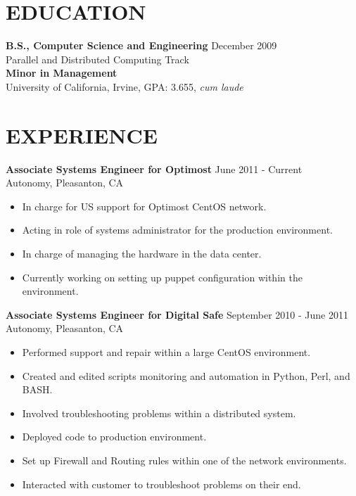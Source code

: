 \documentclass[10pt,line,margin]{res}
\begin{document}
\address{4245 Stanley Blvd. Apt. 6, Pleasanton, CA}
\address{jobs@apeschel.fastmail.fm or (760)-791-7301}

\begin{resume}
\section{EDUCATION}
    {\bf B.S., Computer Science and Engineering} \hfill December 2009 \\
    Parallel and Distributed Computing Track \\
    {\bf Minor in Management} \\
    University of California, Irvine, GPA: 3.655, \textit{cum laude}

\section{EXPERIENCE}
    {\bf Associate Systems Engineer for Optimost} \hfill June 2011 - Current\\
    Autonomy, Pleasanton, CA
    \begin{itemize} \itemsep -2pt
    \item In charge for US support for Optimost CentOS network.
    \item Acting in role of systems administrator for the production environment.
    \item In charge of managing the hardware in the data center.
    \item Currently working on setting up puppet configuration within the environment.
    \end{itemize}

    {\bf Associate Systems Engineer for Digital Safe} \hfill September 2010 - June 2011 \\
    Autonomy, Pleasanton, CA
    \begin{itemize} \itemsep -2pt
    \item Performed support and repair within a large CentOS environment.
    \item Created and edited scripts monitoring and automation in Python, Perl, and BASH.
    \item Involved troubleshooting problems within a distributed system.
    \item Deployed code to production environment.
    \item Set up Firewall and Routing rules within one of the network environments.
    \item Interacted with customer to troubleshoot problems on their end.
    \end{itemize}


\end{resume}
\end{document}
